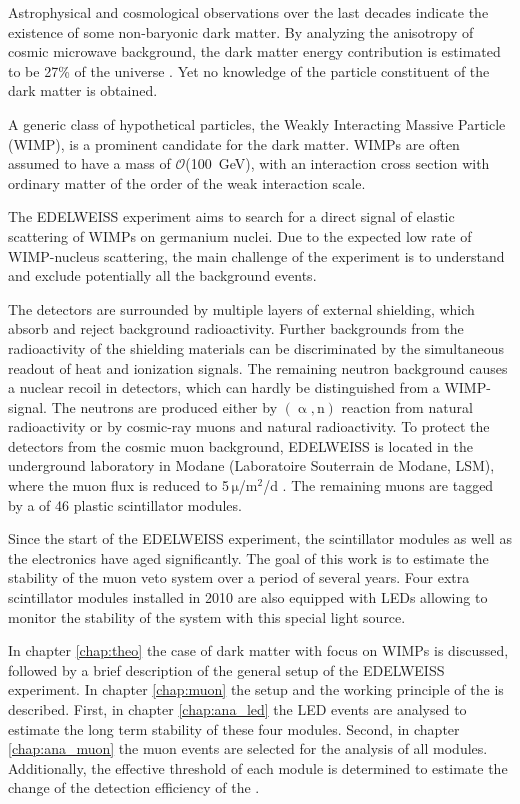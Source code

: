 Astrophysical and cosmological observations over the last decades indicate the existence of some non-baryonic dark matter. By analyzing the anisotropy of cosmic microwave background, the dark matter energy contribution is estimated to be 27\% of the universe \cite{Pla16}. Yet no knowledge of the particle constituent of the dark matter is obtained.

A generic class of hypothetical particles, the Weakly Interacting Massive Particle (WIMP), is a prominent candidate for the dark matter. WIMPs are often assumed to have a mass of $\mathcal{O}$(\SI{100}{GeV}), with an interaction cross section with ordinary matter of the order of the weak interaction scale.

The EDELWEISS experiment aims to search for a direct signal of elastic scattering of WIMPs on germanium nuclei. Due to the expected low rate of WIMP-nucleus scattering, the main challenge of the experiment is to understand and exclude potentially all the background events.

The detectors are surrounded by multiple layers of external shielding, which absorb and reject background radioactivity. Further backgrounds from the radioactivity of the shielding materials can be discriminated by the simultaneous readout of heat and ionization signals. The remaining neutron background causes a nuclear recoil in detectors, which can hardly be distinguished from a WIMP-signal. The neutrons are produced either by $(\upalpha,\mathrm{n})$ reaction from natural radioactivity or by cosmic-ray muons and natural radioactivity. To protect the detectors from the cosmic muon background, EDELWEISS is located in the underground laboratory in Modane (Laboratoire Souterrain de Modane, LSM), where the muon flux is reduced to 5\,$\mathrm{\mu}$/$\mathrm{m}^{2}$/d \cite{Sch13a}. The remaining muons are tagged by a \mvs{} of 46 plastic scintillator modules.

Since the start of the EDELWEISS experiment, the scintillator modules as well as the electronics have aged significantly. The goal of this work is to estimate the stability of the muon veto system over a period of several years. Four extra scintillator modules installed in 2010 are also equipped with LEDs allowing to monitor the stability of the system with this special light source.

In chapter \ref{chap:theo} the case of dark matter with focus on WIMPs is discussed, followed by a brief description of the general setup of the EDELWEISS experiment. In chapter \ref{chap:muon} the setup and the working principle of the \mvs is described. First, in chapter \ref{chap:ana_led} the LED events are analysed to estimate the long term stability of these four modules. Second, in chapter \ref{chap:ana_muon} the muon events are selected for the analysis of all modules. Additionally, the effective threshold of each module is determined to estimate the change of the detection efficiency of the \mvs.
